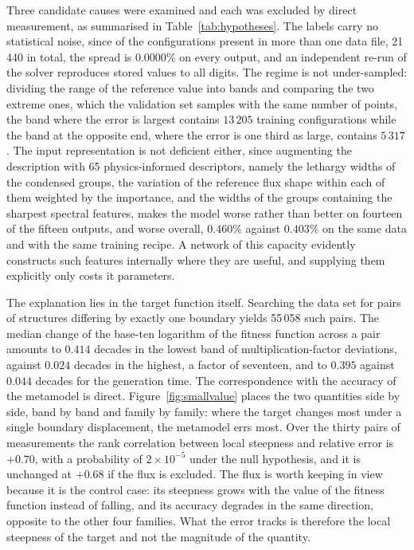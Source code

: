 \documentclass{style/nseJournal}
\begin{document}
Three candidate causes were examined and each was excluded by direct
measurement, as summarised in Table~\ref{tab:hypotheses}. The labels carry no
statistical noise, since of the configurations present in more than one data
file, 21\,440 in total, the spread is $0.0000\%$ on every output, and an
independent re-run of the solver reproduces stored values to all digits. The
regime is not under-sampled: dividing the range of the reference value into
bands and comparing the two extreme ones, which the validation set samples with
the same number of points, the band where the error is largest contains
$13\,205$ training configurations while the band at the opposite end, where the
error is one third as large, contains $5\,317$. The input representation is not
deficient either, since augmenting the description with 65 physics-informed
descriptors, namely the lethargy widths of the condensed groups, the variation
of the reference flux shape within each of them weighted by the importance, and
the widths of the groups containing the sharpest spectral features, makes the
model worse rather than better on fourteen of the fifteen outputs, and worse
overall, $0.460\%$ against $0.403\%$ on the same data and with the same training
recipe. A network of this capacity evidently constructs such features internally
where they are useful, and supplying them explicitly only costs it parameters.



The explanation lies in the target function itself. Searching the data set for
pairs of structures differing by exactly one boundary yields 55\,058 such pairs.
The median change of the base-ten logarithm of the fitness function across a
pair amounts to $0.414$ decades in the lowest band of multiplication-factor
deviations, against $0.024$ decades in the highest, a factor of seventeen, and
to $0.395$ against $0.044$ decades for the generation time.
The correspondence with the accuracy of the metamodel is direct.
Figure~\ref{fig:smallvalue} places the two quantities side by side, band by band
and family by family: where the target changes most under a single boundary
displacement, the metamodel errs most. Over the thirty pairs of measurements the
rank correlation between local steepness and relative error is $+0.70$, with a
probability of $2\times10^{-5}$ under the null hypothesis, and it is unchanged
at $+0.68$ if the flux is excluded. The flux is worth keeping in view because it
is the control case: its steepness grows with the value of the fitness function
instead of falling, and its accuracy degrades in the same direction, opposite to
the other four families. What the error tracks is therefore the local steepness
of the target and not the magnitude of the quantity.
\end{document}
